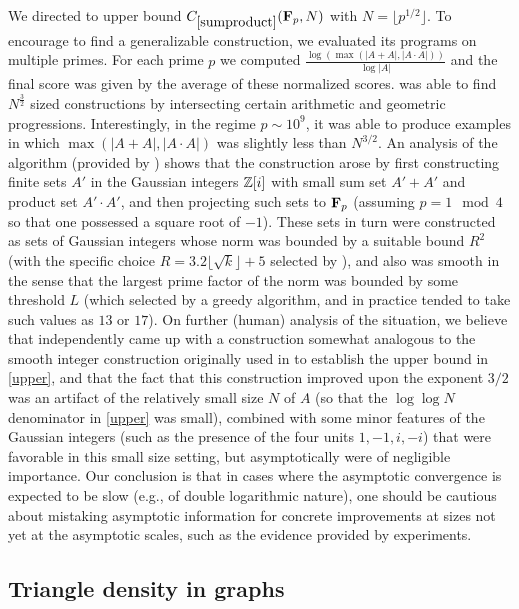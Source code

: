 We directed \AlphaEvolve to upper bound $C_{\ref{sumproduct}}(\mathbf{F}_p,N)$ with $N = \lfloor p^{1/2}\rfloor$.  To encourage \AlphaEvolve to find a generalizable construction, we evaluated its programs on multiple primes. For each prime $p$ we computed $\frac{\log \left(\max( |A+A|, |A \cdot A| )\right)}{\log |A|}$ and  the final score was given by the average of these normalized scores. \AlphaEvolve was able to find  $N^{\frac32}$ sized constructions by intersecting certain arithmetic and geometric progressions. Interestingly, in the regime $p \sim 10^9$, it was able to produce examples in which $\max(|A+A|, |A \cdot A|)$ was slightly less than $N^{3/2}$.  An analysis of the algorithm (provided by \DeepThink) shows that the construction arose by first constructing finite sets $A'$ in the Gaussian integers $\mathbb{Z}[i]$ with small sum set $A'+A'$ and product set $A' \cdot A'$, and then projecting such sets to $\mathbf{F}_p$ (assuming $p=1 \mod 4$ so that one possessed a square root of $-1$).  These sets in turn were constructed as sets of Gaussian integers whose norm was bounded by a suitable bound $R^2$ (with the specific choice $R = 3.2 \lfloor \sqrt{k}\rfloor + 5$ selected by \AlphaEvolve), and also was smooth in the sense that the largest prime factor of the norm was bounded by some threshold $L$ (which \AlphaEvolve selected by a greedy algorithm, and in practice tended to take such values as $13$ or $17$).  On further (human) analysis of the situation, we believe that \AlphaEvolve independently came up with a construction somewhat analogous to the smooth integer construction originally used in \cite{sum-product} to establish the upper bound in \eqref{upper}, and that the fact that this construction improved upon the exponent $3/2$ was an artifact of the relatively small size $N$ of $A$ (so that the $\log\log N$ denominator in \eqref{upper} was small), combined with some minor features of the Gaussian integers (such as the presence of the four units $1, -1, i, -i$) that were favorable in this small size setting, but asymptotically were of negligible importance.  Our conclusion is that in cases where the asymptotic convergence is expected to be slow (e.g., of double logarithmic nature), one should be cautious about 
mistaking asymptotic information for concrete improvements at sizes not yet at the asymptotic scales, such as the evidence provided by \AlphaEvolve experiments.


\subsection{Triangle density in graphs}
\label{triangledensity}

